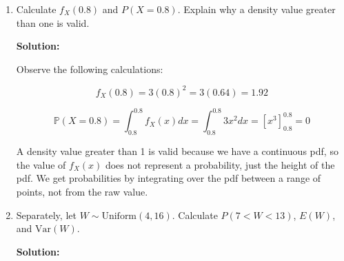 \documentclass[11pt]{article}
\newcommand{\solution}{\par\medskip\noindent\textbf{Solution:}\par\vspace{0cm}}
\begin{document}
\begin{enumerate}[label=\textbf{(\alph*)}]
  Observe the following calculations for $\mathbb{E}X$, $\mathbb{E}X^2$, and $\text{Var}X$:

  \begin{align*}
    \mathbb{E}X &= \int_{-\infty}^{\infty} xf_X(x) dx \\
    &= \int_{0}^{1} x(3x^2) dx \\
    &= [\frac{3}{4}x^4]_0^1 \\
    &= \frac{3}{4}1^4 - \frac{3}{4}0^4 \\
    &= \frac{3}{4}
  \end{align*}

  \begin{align*}
    \mathbb{E}X^2 &= \int_{-\infty}^{\infty} x^2f_X(x) dx \\
    &= \int_{0}^{1} x^2(3x^2) dx \\
    &= [\frac{3}{5}x^5]_0^1 \\
    &= \frac{3}{5}1^5 - \frac{3}{4}0^4 \\
    &= \frac{3}{5}
  \end{align*}

  \begin{align*}
    \text{Var}(X) &= \mathbb{E}X^2 - (\mathbb{E}X)^2 \\
    &= \frac{3}{5} - (\frac{3}{4})^2 \\
    &= \frac{3}{5} - \frac{9}{16} \\
    &= \frac{48}{80} - \frac{45}{80} \\
    &= \frac{3}{80}
  \end{align*}

  \item Calculate $f_X(0.8)$ and $P(X = 0.8)$. Explain why a density value greater than one is valid.
  \solution

  Observe the following calculations:

  \[
  f_X(0.8) = 3(0.8)^2 = 3(0.64) = 1.92
  \]

  \[
  \mathbb{P}(X = 0.8) = \int_{0.8}^{0.8} f_X(x) dx = \int_{0.8}^{0.8} 3x^2 dx = [x^3]_{0.8}^{0.8} = 0
  \]

  A density value greater than 1 is valid because we have a continuous pdf, so the value of $f_X(x)$ does not represent a probability, just the height of the pdf. We get probabilities by integrating over the pdf between a range of points, not from the raw value.


  \item Separately, let $W \sim \text{Uniform}(4, 16)$. Calculate $P(7 < W < 13)$, $E(W)$, and $\text{Var}(W)$.
  \solution


\end{enumerate}
\end{document}
